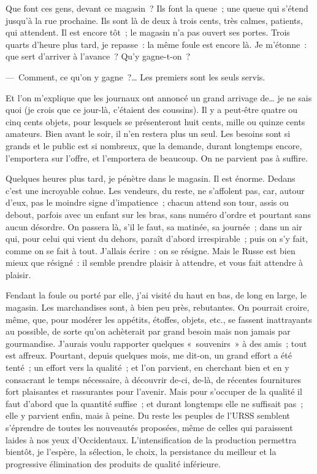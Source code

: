\documentclass[twoside]{book} %
\newcommand{\astermono}{\medskip\centerline{\color{rubric}\large\selectfont{\syms ✻}}\medskip\par}%
\begin{document}
\astermono

\noindent Que font ces gens, devant ce magasin ? Ils font la queue ; une queue qui s’étend jusqu’à la rue prochaine. Ils sont là de deux à trois cents, très calmes, patients, qui attendent. Il est encore tôt ; le magasin n’a pas ouvert ses portes. Trois quarts d’heure plus tard, je repasse : la même foule est encore là. Je m’étonne : que sert d’arriver à l’avance ? Qu’y gagne-t-on ?\par
— Comment, ce qu’on y gagne ?… Les premiers sont les seuls servis.\par
Et l’on m’explique que les journaux ont annoncé un grand arrivage de… je ne sais quoi (je crois que ce jour-là, c’étaient des coussins). Il y a peut-être quatre ou cinq cents objets, pour lesquels se présenteront huit cents, mille ou quinze cents amateurs. Bien avant le soir, il n’en restera plus un seul. Les besoins sont si grands et le public est si nombreux, que la demande, durant longtemps encore, l’emportera sur l’offre, et l’emportera de beaucoup. On ne parvient pas à suffire.\par
Quelques heures plus tard, je pénètre dans le magasin. Il est énorme. Dedans c’est une incroyable cohue. Les vendeurs, du reste, ne s’affolent pas, car, autour d’eux, pas le moindre signe d’impatience ; chacun attend son tour, assis ou debout, parfois avec un enfant sur les bras, sans numéro d’ordre et pourtant sans aucun désordre. On passera là, s’il le faut, sa matinée, sa journée ; dans un air qui, pour celui qui vient du dehors, paraît d’abord irrespirable ; puis on s’y fait, comme on se fait à tout. J’allais écrire : on se résigne. Mais le Russe est bien mieux que résigné : il semble prendre plaisir à attendre, et vous fait attendre à plaisir.\par
Fendant la foule ou porté par elle, j’ai visité du haut en bas, de long en large, le magasin. Les marchandises sont, à bien peu près, rebutantes. On pourrait croire, même, que, pour modérer les appétits, étoffes, objets, etc., se fassent inattrayants au possible, de sorte qu’on achèterait par grand besoin mais non jamais par gourmandise. J’aurais voulu rapporter quelques « souvenirs » à des amis ; tout est affreux. Pourtant, depuis quelques mois, me dit-on, un grand effort a été tenté ; un effort vers la qualité ; et l’on parvient, en cherchant bien et en y consacrant le temps nécessaire, à découvrir de-ci, de-là, de récentes fournitures fort plaisantes et rassurantes pour l’avenir. Mais pour s’occuper de la qualité il faut d’abord que la quantité suffise ; et durant longtemps elle ne suffisait pas ; elle y parvient enfin, mais à peine. Du reste les peuples de l’URSS semblent s’éprendre de toutes les nouveautés proposées, même de celles qui paraissent laides à nos yeux d’Occidentaux. L’intensification de la production permettra bientôt, je l’espère, la sélection, le choix, la persistance du meilleur et la progressive élimination des produits de qualité inférieure.\par
\end{document}
